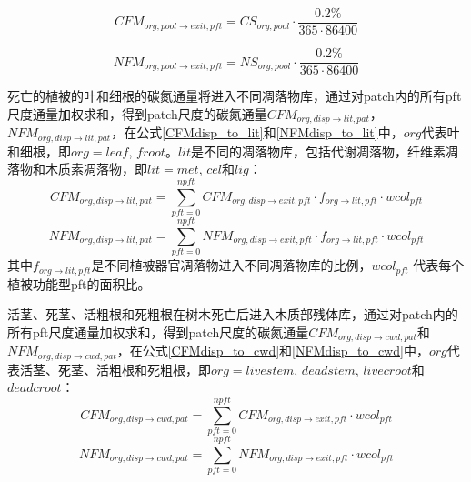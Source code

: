 \begin{equation}\label{CFMexit}
  CFM_{org,pool\rightarrow exit,pft}=CS_{org,pool}\cdot \frac{0.2\%}{365\cdot 86400}
\end{equation}

\begin{equation}\label{NFMexit}
  NFM_{org,pool\rightarrow exit,pft}=NS_{org,pool}\cdot \frac{0.2\%}{365\cdot 86400}
\end{equation}

死亡的植被的叶和细根的碳氮通量将进入不同凋落物库，通过对patch内的所有pft尺度通量加权求和，得到patch尺度的碳氮通量$CFM_{org,disp\rightarrow lit,pat}$，$NFM_{org,disp\rightarrow lit,pat}$，在公式\eqref{CFMdisp_to_lit}和\eqref{NFMdisp_to_lit}中，$org$代表叶和细根，即$org=leaf$, $froot$。$lit$是不同的凋落物库，包括代谢凋落物，纤维素凋落物和木质素凋落物，即$lit=met$, $cel$和$lig$：
\begin{equation}\label{CFMdisp_to_lit}
CFM_{org,disp\rightarrow lit,pat}=\sum_{pft=0}^{npft}{CFM_{org,disp\rightarrow exit,pft}\cdot f_{{org}\rightarrow lit,pft}\cdot{wcol_{pft}}}
\end{equation}
\begin{equation}\label{NFMdisp_to_lit}
NFM_{org,disp\rightarrow lit,pat}=\sum_{pft=0}^{npft}{NFM_{org,disp\rightarrow exit,pft}\cdot f_{{org}\rightarrow lit,pft}\cdot{wcol_{pft}}}
\end{equation}
其中$f_{org\rightarrow lit,pft}$是不同植被器官凋落物进入不同凋落物库的比例，${wcol_{pft}}$ 代表每个植被功能型pft的面积比。


活茎、死茎、活粗根和死粗根在树木死亡后进入木质部残体库，通过对patch内的所有pft尺度通量加权求和，得到patch尺度的碳氮通量$CFM_{org,disp\rightarrow cwd,pat}$和$NFM_{org,disp\rightarrow cwd,pat}$，在公式\eqref{CFMdisp_to_cwd}和\eqref{NFMdisp_to_cwd}中，$org$代表活茎、死茎、活粗根和死粗根，即$org=livestem$, $deadstem$, $livecroot$和$deadcroot$：
\begin{equation}\label{CFMdisp_to_cwd}
  CFM_{org,disp\rightarrow cwd,pat}=\sum_{pft=0}^{npft}{CFM_{org,disp\rightarrow exit,pft}\cdot {wcol_{pft}}}
\end{equation}
\begin{equation}\label{NFMdisp_to_cwd}
  NFM_{org,disp\rightarrow cwd,pat}=\sum_{pft=0}^{npft}{NFM_{org,disp\rightarrow exit,pft}\cdot {wcol_{pft}}}
\end{equation}

